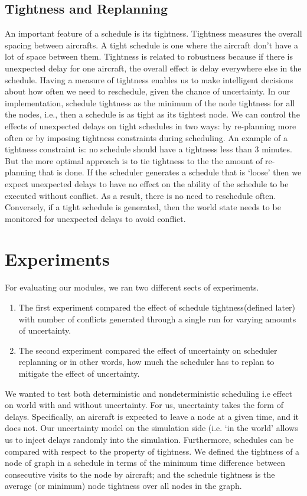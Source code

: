 \documentclass[conference]{IEEEtran}
\begin{document}
\subsection{Tightness and Replanning}
An important feature of a schedule is its tightness. Tightness measures the overall spacing between aircrafts. A tight schedule is one where the aircraft don't have a lot of space between them. Tightness is related to robustness because if there is unexpected delay for one aircraft, the overall effect is delay everywhere else in the schedule. Having a measure of tightness enables us to make intelligent decisions about how often we need to reschedule, given the chance of uncertainty. In our implementation, schedule tightness as the minimum of the node tightness for all the nodes, i.e., then a schedule is as tight as its tightest node.
We can control the effects of unexpected delays on tight schedules in two ways: by re-planning more often or by imposing tightness constraints during scheduling. An example of a tightness constraint is: no schedule should have a tightness less than 3 minutes. But the more optimal approach is to tie tightness to the the amount of re-planning that is done. If the scheduler generates a schedule that is `loose' then we expect unexpected delays to have no effect on the ability of the schedule to be executed without conflict. As a result, there is no need to reschedule often. Conversely, if a tight schedule is generated, then the world state needs to be monitored for unexpected delays to avoid conflict.


\section{Experiments}

For evaluating our modules, we ran two different sects of experiments. 

\begin{enumerate}
	\item The first experiment compared the effect of schedule tightness(defined later) with number of conflicts generated through a single run for varying amounts of uncertainty. 
	\item The second experiment compared the effect of uncertainty on scheduler replanning or in other words, how much the scheduler has to replan to mitigate the effect of uncertainty.
\end{enumerate}

We wanted to test both deterministic and nondeterministic scheduling i.e effect on world with and without uncertainty. For us, uncertainty takes the form of delays. Specifically, an aircraft is expected to leave a node at a given time, and it does not. Our uncertainty model on the simulation side (i.e. `in the world' allows us to inject delays randomly into the simulation. Furthermore, schedules can be compared with respect to the property of tightness. We defined the tightness of a node of graph in a schedule in terms of the minimum time difference between consecutive visits to the node by aircraft; and the schedule tightness is the average (or minimum) node tightness over all nodes in the graph.
\end{document}
